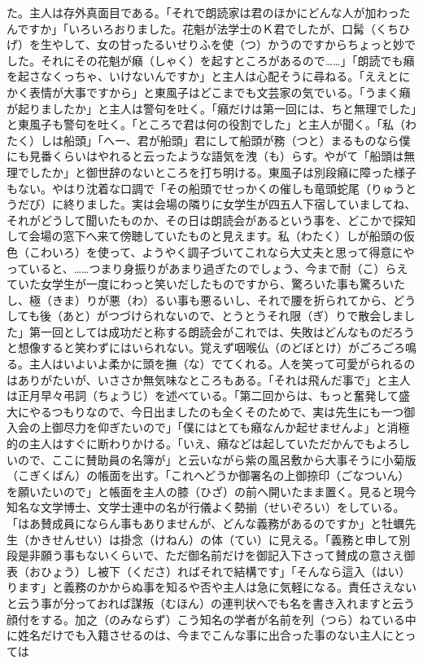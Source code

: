 \documentclass{book}
\begin{document}
た。主人は存外真面目である。「それで朗読家は君のほかにどんな人が加わったんですか」「いろいろおりました。花魁が法学士のＫ君でしたが、口髯（くちひげ）を生やして、女の甘ったるいせりふを使（つ）かうのですからちょっと妙でした。それにその花魁が癪（しゃく）を起すところがあるので\ldots{}\ldots{}」「朗読でも癪を起さなくっちゃ、いけないんですか」と主人は心配そうに尋ねる。「ええとにかく表情が大事ですから」と東風子はどこまでも文芸家の気でいる。「うまく癪が起りましたか」と主人は警句を吐く。「癪だけは第一回には、ちと無理でした」と東風子も警句を吐く。「ところで君は何の役割でした」と主人が聞く。「私（わたく）しは船頭」「へー、君が船頭」君にして船頭が務（つと）まるものなら僕にも見番くらいはやれると云ったような語気を洩（も）らす。やがて「船頭は無理でしたか」と御世辞のないところを打ち明ける。東風子は別段癪に障った様子もない。やはり沈着な口調で「その船頭でせっかくの催しも竜頭蛇尾（りゅうとうだび）に終りました。実は会場の隣りに女学生が四五人下宿していましてね、それがどうして聞いたものか、その日は朗読会があるという事を、どこかで探知して会場の窓下へ来て傍聴していたものと見えます。私（わたく）しが船頭の仮色（こわいろ）を使って、ようやく調子づいてこれなら大丈夫と思って得意にやっていると、\ldots{}\ldots{}つまり身振りがあまり過ぎたのでしょう、今まで耐（こ）らえていた女学生が一度にわっと笑いだしたものですから、驚ろいた事も驚ろいたし、極（きま）りが悪（わ）るい事も悪るいし、それで腰を折られてから、どうしても後（あと）がつづけられないので、とうとうそれ限（ぎ）りで散会しました」第一回としては成功だと称する朗読会がこれでは、失敗はどんなものだろうと想像すると笑わずにはいられない。覚えず咽喉仏（のどぼとけ）がごろごろ鳴る。主人はいよいよ柔かに頭を撫（な）でてくれる。人を笑って可愛がられるのはありがたいが、いささか無気味なところもある。「それは飛んだ事で」と主人は正月早々弔詞（ちょうじ）を述べている。「第二回からは、もっと奮発して盛大にやるつもりなので、今日出ましたのも全くそのためで、実は先生にも一つ御入会の上御尽力を仰ぎたいので」「僕にはとても癪なんか起せませんよ」と消極的の主人はすぐに断わりかける。「いえ、癪などは起していただかんでもよろしいので、ここに賛助員の名簿が」と云いながら紫の風呂敷から大事そうに小菊版（こぎくばん）の帳面を出す。「これへどうか御署名の上御捺印（ごなついん）を願いたいので」と帳面を主人の膝（ひざ）の前へ開いたまま置く。見ると現今知名な文学博士、文学士連中の名が行儀よく勢揃（せいぞろい）をしている。「はあ賛成員にならん事もありませんが、どんな義務があるのですか」と牡蠣先生（かきせんせい）は掛念（けねん）の体（てい）に見える。「義務と申して別段是非願う事もないくらいで、ただ御名前だけを御記入下さって賛成の意さえ御表（おひょう）し被下（くださ）ればそれで結構です」「そんなら這入（はい）ります」と義務のかからぬ事を知るや否や主人は急に気軽になる。責任さえないと云う事が分っておれば謀叛（むほん）の連判状へでも名を書き入れますと云う顔付をする。加之（のみならず）こう知名の学者が名前を列（つら）ねている中に姓名だけでも入籍させるのは、今までこんな事に出合った事のない主人にとっては
\end{document}
